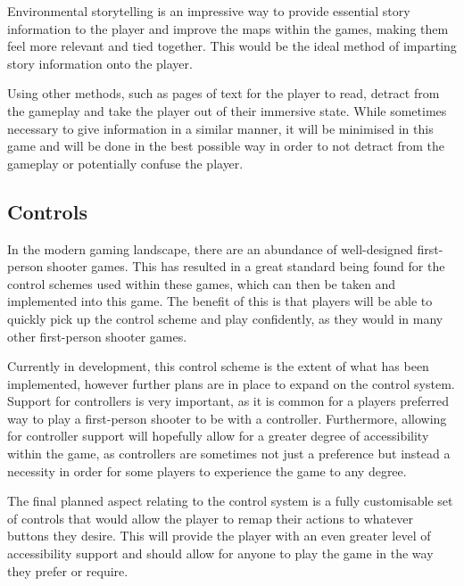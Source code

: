 \documentclass[11pt]{article}
\begin{document}
Environmental storytelling is an impressive way to provide essential story information to the
player and improve the maps within the games, making them feel more relevant and tied together.
This would be the ideal method of imparting story information onto the player. 

Using other methods, such as pages of text for the player to read, detract from the gameplay and
take the player out of their immersive state. While sometimes necessary to give information in a
similar manner, it will be minimised in this game and will be done in the best possible way in
order to not detract from the gameplay or potentially confuse the player. \\

\subsection{Controls}
In the modern gaming landscape, there are an abundance of well-designed first-person shooter
games. This has resulted in a great standard being found for the control schemes used within
these games, which can then be taken and implemented into this game. The benefit of this is that
players will be able to quickly pick up the control scheme and play confidently, as they would in
many other first-person shooter games. 

Currently in development, this control scheme is the extent of what has been implemented, however
further plans are in place to expand on the control system. Support for controllers is very
important, as it is common for a players preferred way to play a first-person shooter to be with a
controller. Furthermore, allowing for controller support will hopefully allow for a greater degree
of accessibility within the game, as controllers are sometimes not just a preference but instead a
necessity in order for some players to experience the game to any degree. 

The final planned aspect relating to the control system is a fully customisable set of controls
that would allow the player to remap their actions to whatever buttons they desire. This will
provide the player with an even greater level of accessibility support and should allow for anyone
to play the game in the way they prefer or require. \\
\end{document}
